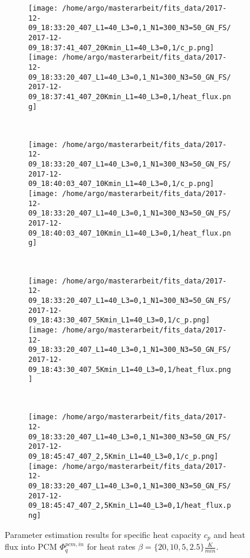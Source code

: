 \documentclass{scrartcl}[12pt, halfparskip]
\numberwithin{equation}{section}
\numberwithin{figure}{section}
\numberwithin{table}{section}
\begin{document}
\begin{figure}[H]
	\begin{subfigure}{1.\textwidth}
		\texttt{[image: /home/argo/masterarbeit/fits\_data/2017-12-09\_18:33:20\_407\_L1=40\_L3=0,1\_N1=300\_N3=50\_GN\_FS/2017-12-09\_18:37:41\_407\_20Kmin\_L1=40\_L3=0,1/c\_p.png]}
		\texttt{[image: /home/argo/masterarbeit/fits\_data/2017-12-09\_18:33:20\_407\_L1=40\_L3=0,1\_N1=300\_N3=50\_GN\_FS/2017-12-09\_18:37:41\_407\_20Kmin\_L1=40\_L3=0,1/heat\_flux.png]}
	\end{subfigure} \\[1ex]
	
	\begin{subfigure}{1.\textwidth}
		\texttt{[image: /home/argo/masterarbeit/fits\_data/2017-12-09\_18:33:20\_407\_L1=40\_L3=0,1\_N1=300\_N3=50\_GN\_FS/2017-12-09\_18:40:03\_407\_10Kmin\_L1=40\_L3=0,1/c\_p.png]}
		\texttt{[image: /home/argo/masterarbeit/fits\_data/2017-12-09\_18:33:20\_407\_L1=40\_L3=0,1\_N1=300\_N3=50\_GN\_FS/2017-12-09\_18:40:03\_407\_10Kmin\_L1=40\_L3=0,1/heat\_flux.png]}
	\end{subfigure} \\[1ex]
	
	\begin{subfigure}{1.\textwidth}
		\texttt{[image: /home/argo/masterarbeit/fits\_data/2017-12-09\_18:33:20\_407\_L1=40\_L3=0,1\_N1=300\_N3=50\_GN\_FS/2017-12-09\_18:43:30\_407\_5Kmin\_L1=40\_L3=0,1/c\_p.png]}
		\texttt{[image: /home/argo/masterarbeit/fits\_data/2017-12-09\_18:33:20\_407\_L1=40\_L3=0,1\_N1=300\_N3=50\_GN\_FS/2017-12-09\_18:43:30\_407\_5Kmin\_L1=40\_L3=0,1/heat\_flux.png]}
	\end{subfigure} \\[1ex]
	
	\begin{subfigure}{1.\textwidth}
		\texttt{[image: /home/argo/masterarbeit/fits\_data/2017-12-09\_18:33:20\_407\_L1=40\_L3=0,1\_N1=300\_N3=50\_GN\_FS/2017-12-09\_18:45:47\_407\_2,5Kmin\_L1=40\_L3=0,1/c\_p.png]}
		\texttt{[image: /home/argo/masterarbeit/fits\_data/2017-12-09\_18:33:20\_407\_L1=40\_L3=0,1\_N1=300\_N3=50\_GN\_FS/2017-12-09\_18:45:47\_407\_2,5Kmin\_L1=40\_L3=0,1/heat\_flux.png]}
	\end{subfigure}
	\caption{Parameter estimation results for specific heat capacity $c_p$ and heat flux into PCM $\varPhi_q^{pcm,in}$ for heat rates $\beta=\{ 20, 10, 5, 2.5 \} \frac{K}{min}$.}
	\label{fig:optim_c_p_heat_flux_FS_1}
\end{figure}
\end{document}
